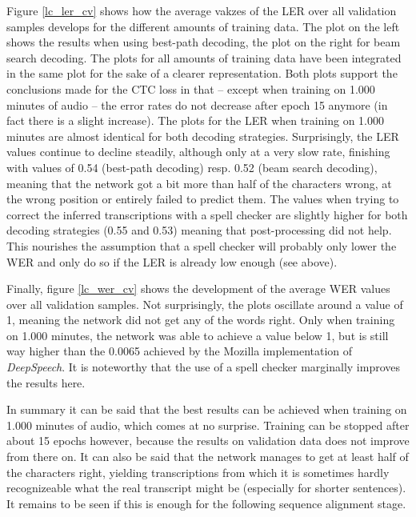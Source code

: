 Figure \ref{lc_ler_cv} shows how the average vakzes of the \ac{LER} over all validation samples develops for the different amounts of training data. The plot on the left shows the results when using best-path decoding, the plot on the right for beam search decoding. The plots for all amounts of training data have been integrated in the same plot for the sake of a clearer representation. Both plots support the conclusions made for the CTC loss in that -- except when training on 1.000 minutes of audio -- the error rates do not decrease after epoch 15 anymore (in fact there is a slight increase). The plots for the \ac{LER} when training on 1.000 minutes are almost identical for both decoding strategies. Surprisingly, the \ac{LER} values continue to decline steadily, although only at a very slow rate, finishing with values of 0.54 (best-path decoding) resp. 0.52 (beam search decoding), meaning that the network got a bit more than half of the characters wrong, at the wrong position or entirely failed to predict them. The values when trying to correct the inferred transcriptions with a spell checker are slightly higher for both decoding strategies (0.55 and 0.53) meaning that post-processing did not help. This nourishes the assumption that a spell checker will probably only lower the \ac{WER} and only do so if the \ac{LER} is already low enough (see above).

Finally, figure \ref{lc_wer_cv} shows the development of the average \ac{WER} values over all validation samples. Not surprisingly, the plots oscillate around a value of 1, meaning the network did not get any of the words right. Only when training on 1.000 minutes, the network was able to achieve a value below 1, but is still way higher than the 0.0065 achieved by the Mozilla implementation of \textit{DeepSpeech}. It is noteworthy that the use of a spell checker marginally improves the results here.

In summary it can be said that the best results can be achieved when training on 1.000 minutes of audio, which comes at no surprise. Training can be stopped after about 15 epochs however, because the results on validation data does not improve from there on. It can also be said that the network manages to get at least half of the characters right, yielding transcriptions from which it is sometimes hardly recognizeable what the real transcript might be (especially for shorter sentences). It remains to be seen if this is enough for the following sequence alignment stage.

